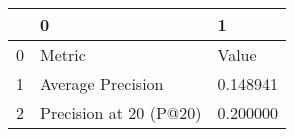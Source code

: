 \begin{tabular}{lll}
\toprule
 & 0 & 1 \\
\midrule
0 & Metric & Value \\
1 & Average Precision & 0.148941 \\
2 & Precision at 20 (P@20) & 0.200000 \\
\bottomrule
\end{tabular}
